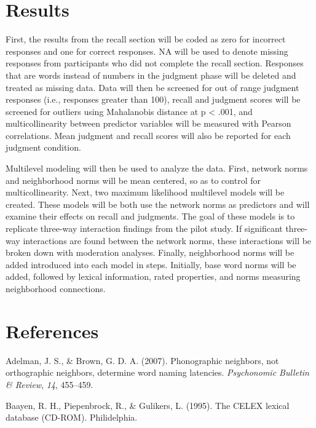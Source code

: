 \documentclass[english,man]{apa6}
\theoremstyle{definition}
\theoremstyle{definition}
\theoremstyle{remark}
\begin{document}
\section{Results}\label{results}

First, the results from the recall section will be coded as zero for
incorrect responses and one for correct responses. NA will be used to
denote missing responses from participants who did not complete the
recall section. Responses that are words instead of numbers in the
judgment phase will be deleted and treated as missing data. Data will
then be screened for out of range judgment responses (i.e., responses
greater than 100), recall and judgment scores will be screened for
outliers using Mahalanobis distance at p \textless{} .001, and
multicollinearity between predictor variables will be measured with
Pearson correlations. Mean judgment and recall scores will also be
reported for each judgment condition.

Multilevel modeling will then be used to analyze the data. First,
network norms and neighborhood norms will be mean centered, so as to
control for multicollinearity. Next, two maximum likelihood multilevel
models will be created. These models will be both use the network norms
as predictors and will examine their effects on recall and judgments.
The goal of these models is to replicate three-way interaction findings
from the pilot study. If significant three-way interactions are found
between the network norms, these interactions will be broken down with
moderation analyses. Finally, neighborhood norms will be added
introduced into each model in steps. Initially, base word norms will be
added, followed by lexical information, rated properties, and norms
measuring neighborhood connections.

\newpage

\section{References}\label{references}

\setlength{\parindent}{-0.5in} \setlength{\leftskip}{0.5in}

\hypertarget{refs}{}
\hypertarget{ref-Adelman2007}{}
Adelman, J. S., \& Brown, G. D. A. (2007). Phonographic neighbors, not
orthographic neighbors, determine word naming latencies.
\emph{Psychonomic Bulletin \& Review}, \emph{14}, 455--459.

\hypertarget{ref-Baayen1995}{}
Baayen, R. H., Piepenbrock, R., \& Gulikers, L. (1995). The CELEX
lexical database (CD-ROM). Philidelphia.
\end{document}

